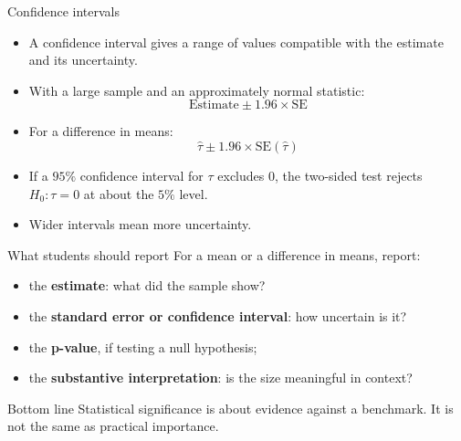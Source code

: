 \documentclass[aspectratio=169]{beamer}
\begin{document}
\begin{frame}{Confidence intervals}
    \begin{itemize}
        \item A confidence interval gives a range of values compatible with the estimate and its uncertainty.
        \item With a large sample and an approximately normal statistic:
        \[
            \text{Estimate} \pm 1.96 \times \mathrm{SE}
        \]
        \item For a difference in means:
        \[
            \widehat{\tau} \pm 1.96 \times \mathrm{SE}(\widehat{\tau})
        \]
        \item If a \(95\%\) confidence interval for \(\tau\) excludes \(0\), the two-sided test rejects \(H_0:\tau=0\) at about the \(5\%\) level.
        \item Wider intervals mean more uncertainty.
    \end{itemize}
\end{frame}

\begin{frame}{What students should report}
    For a mean or a difference in means, report:
    \begin{itemize}
        \item the \textbf{estimate}: what did the sample show?
        \item the \textbf{standard error or confidence interval}: how uncertain is it?
        \item the \textbf{p-value}, if testing a null hypothesis;
        \item the \textbf{substantive interpretation}: is the size meaningful in context?
    \end{itemize}

    \vspace{0.2cm}
    \begin{coolblock}{Bottom line}
        Statistical significance is about evidence against a benchmark. It is not the same as practical importance.
    \end{coolblock}
\end{frame}
\end{document}
